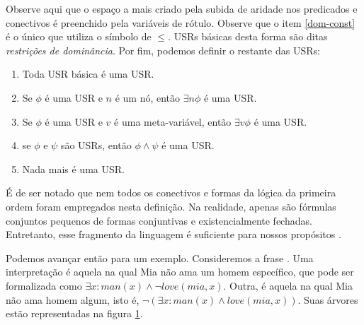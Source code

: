 Observe aqui que o espaço a mais criado pela subida de aridade nos predicados e conectivos é preenchido pela variáveis de rótulo. Observe que o item \ref{dom-const} é o único que utiliza o símbolo de $\leq$. USRs básicas desta forma são ditas \textit{restrições de dominância}. Por fim, podemos definir o restante das USRs:

\begin{enumerate}
\item Toda USR básica é uma USR.
\item Se $\phi$ é uma USR e $n$ é um nó, então $\exists n \phi$ é uma USR.
\item Se $\phi$ é uma USR e $v$ é uma meta-variável, então $\exists v \phi$ é uma USR.
\item se $\phi$ e $\psi$ são USRs, então $\phi \land \psi$ é uma USR.
\item Nada mais é uma USR.
\end{enumerate}

É de ser notado que nem todos os conectivos e formas da lógica da primeira ordem foram empregados nesta definição. Na realidade, apenas são fórmulas conjuntos pequenos de formas conjuntivas e existencialmente fechadas. Entretanto, esse fragmento da linguagem é suficiente para nossos propósitos \citep[p.~131]{BlackburnBos:2005}.

Podemos avançar então para um exemplo. Consideremos a frase . Uma interpretação é aquela na qual Mia não ama um homem específico, que pode ser formalizada como $\exists x: man(x) \land \neg love(mia,x)$. Outra, é aquela na qual Mia não ama homem algum, isto é, $\neg (\exists x: man(x) \land love(mia,x))$. Suas árvores estão representadas na figura \ref{tree:holesem-neg}.

\begin{figure}[h]
\begin{center}
\end{center}
\caption{}
\label{tree:holesem-neg}
\end{figure}

